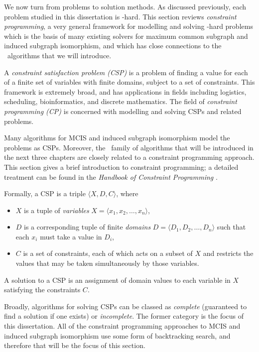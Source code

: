 We now turn from problems to solution methods.  As discussed previously, each
problem studied in this dissertation is \NP-hard.  This section reviews
\emph{constraint programming}, a very general framework for modelling and
solving \NP-hard problems which is the basis of many existing solvers for
maximum common subgraph and induced subgraph isomorphism, and which has close
connections to the \McSplit\ algorithms that we will introduce.

A \emph{constraint satisfaction problem (CSP)} is a problem of finding a value
for each of a finite set of variables with finite domains, subject to a set of constraints.
This framework is extremely broad, and has applications in fields
including logistics, scheduling, bioinformatics, and discrete mathematics.
The field of \emph{constraint programming (CP)} is concerned with modelling
and solving CSPs and related problems.

Many algorithms
for MCIS and induced subgraph isomorphism model the problems as CSPs.
Moreover, the \McSplit\ family of algorithms that will be introduced in the next three chapters
are closely related to a constraint programming approach.
This section gives a brief introduction to constraint programming;
a detailed treatment can be found in the \emph{Handbook of Constraint
Programming} \citep{DBLP:reference/fai/2}.

Formally, a CSP is a triple $\langle X, D, C\rangle$, where

\begin{itemize}
\item $X$ is a tuple of \emph{variables} $X = \langle x_1, x_2, \dots, x_n \rangle$,
\item $D$ is a corresponding tuple of finite \emph{domains} $D = \langle D_1, D_2, \dots, D_n\rangle$
  such that each $x_i$ must take a value in $D_i$,
\item $C$ is a set of constraints, each of which acts on a subset of $X$ and restricts
  the values that may be taken simultaneously by those variables.
\end{itemize}

A solution to a CSP is an assignment of domain values to each variable in $X$
satisfying the constraints $C$.

Broadly, algorithms for solving CSPs can be classed as \emph{complete} (guaranteed to find a solution
if one exists)
or \emph{incomplete}. The former category is the focus of this dissertation.
All of the constraint programming approaches to MCIS and induced
subgraph isomorphism use some form of backtracking search, and therefore that will
be the focus of this section.

